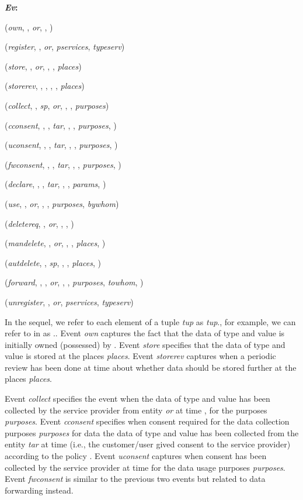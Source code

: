 \documentclass[a4paper]{article}
\newcounter{qcounter}
\begin{document}
\begin{list}
{\bfseries{}\textit{Ev}\textit{}:~}
{
}
\item (\textit{own}, , \textit{or}, , ) 
\item (\textit{register}, , \textit{or}, \textit{pservices}, \textit{typeserv}) 
\item (\textit{store}, , \textit{or}, , , \textit{places})
\item (\textit{storerev}, , , , , \textit{places})
\item (\textit{collect}, , \textit{sp}, \textit{or}, ,  ,   \textit{purposes})
\item (\textit{cconsent}, , , \textit{tar}, , ,  \textit{purposes}, )
\item (\textit{uconsent}, , , \textit{tar}, , , \textit{purposes}, )
\item (\textit{fwconsent}, , , \textit{tar}, , , \textit{purposes}, )
\item (\textit{declare}, , , \textit{tar}, , , \textit{params}, ) 
\item (\textit{use}, , \textit{or}, , , \textit{purposes}, \textit{bywhom}) 
\item (\textit{deletereq}, , \textit{or}, , , ) 
\item (\textit{mandelete}, , \textit{or}, , , \textit{places}, ) 
\item (\textit{autdelete}, , \textit{sp}, , , \textit{places}, ) 
\item (\textit{forward}, , , \textit{or}, , , \textit{purposes}, \textit{towhom}, )
\item (\textit{unregister}, , \textit{or}, \textit{pservices}, \textit{typeserv})
\end{list} 


In the sequel, we refer to each element  of a tuple \textit{tup} as \textit{tup}., for example, we can refer to  in  as .. Event \textit{own} captures the fact that the data of type  and value  is initially owned (possessed) by . Event \textit{store} specifies that the data of type  and value  is 
stored at the places \textit{places}. Event \textit{storerev} captures when a periodic review has been done at time  about whether data  should be stored further at the places \textit{places}.   

Event \textit{collect} specifies the event when the data of type  and value  has been collected by the service provider  from entity \textit{or} at time ,  for the purposes \textit{purposes}. Event \textit{cconsent} specifies when consent required for the data collection purposes \textit{purposes} for data the data of type  and value  has been collected from the entity \textit{tar} at time  (i.e., the customer/user gived consent to the service provider) according to the policy . Event \textit{uconsent} captures when consent has been collected by the service provider at time  for the data usage purposes \textit{purposes}. Event \textit{fwconsent} is similar to the previous two events but related to data forwarding instead.  
\end{document}
